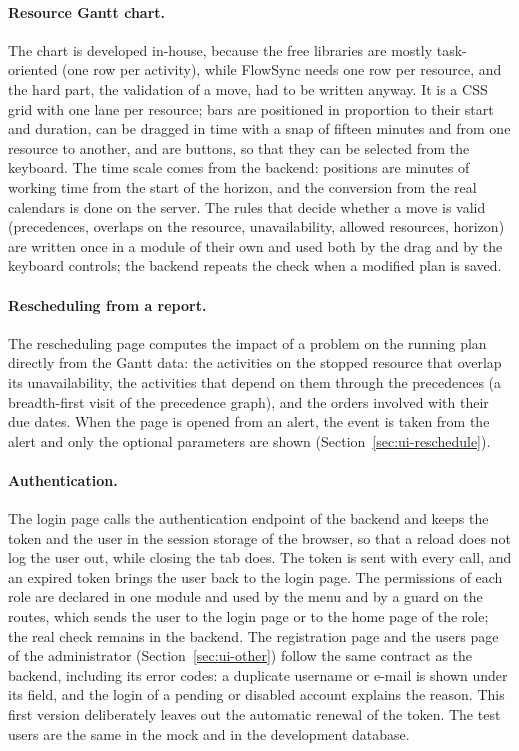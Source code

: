 \paragraph{Resource Gantt chart.} The chart is developed in-house, because the free libraries are
mostly task-oriented (one row per activity), while FlowSync needs one row per resource, and the
hard part, the validation of a move, had to be written anyway. It is a CSS grid with one lane
per resource; bars are positioned in proportion to their start and duration, can be dragged in
time with a snap of fifteen minutes and from one resource to another, and are buttons, so that
they can be selected from the keyboard. The time scale comes from the backend: positions are
minutes of working time from the start of the horizon, and the conversion from the real
calendars is done on the server. The rules that decide whether a move is valid (precedences,
overlaps on the resource, unavailability, allowed resources, horizon) are written once in a
module of their own and used both by the drag and by the keyboard controls; the backend repeats
the check when a modified plan is saved.

\paragraph{Rescheduling from a report.} The rescheduling page computes the impact of a problem
on the running plan directly from the Gantt data: the activities on the stopped resource that
overlap its unavailability, the activities that depend on them through the precedences (a
breadth-first visit of the precedence graph), and the orders involved with their due dates. When
the page is opened from an alert, the event is taken from the alert and only the optional
parameters are shown (Section~\ref{sec:ui-reschedule}).

\paragraph{Authentication.} The login page calls the authentication endpoint of the backend and
keeps the token and the user in the session storage of the browser, so that a reload does not
log the user out, while closing the tab does. The token is sent with every call, and an
expired token brings the user back to the login page. The permissions of each role are declared
in one module and used by the menu and by a guard on the routes, which sends the user to the
login page or to the home page of the role; the real check remains in the backend. The
registration page and the users page of the administrator (Section~\ref{sec:ui-other}) follow
the same contract as the backend, including its error codes: a duplicate username or e-mail is
shown under its field, and the login of a pending or disabled account explains the reason. This
first version deliberately leaves out the automatic renewal of the token. The test users are the
same in the mock and in the development database.

